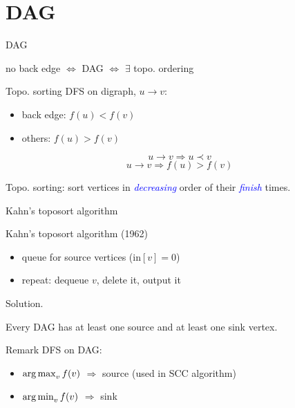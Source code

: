 \section{DAG}

\begin{frame}{DAG}
  \begin{center}
    no back edge $\iff$ DAG $\iff$ $\exists$ topo. ordering
  \end{center}

  \begin{block}{Topo. sorting}
    DFS on digraph, $u \to v$:
    \begin{itemize}
      \item back edge: $f(u) < f(v)$
      \item others: $f(u) > f(v)$
    \end{itemize}

    \[ u \to v \Rightarrow u \prec v \] 
    \[ u \to v \Rightarrow f(u) > f(v) \]

    \begin{center}
      Topo. sorting: sort vertices in \textcolor{blue}{\emph{decreasing}} order of their \textcolor{blue}{\emph{finish}} times.
    \end{center}
  \end{block}
\end{frame}
\begin{frame}{Kahn's toposort algorithm}
  \begin{exampleblock}{Kahn's toposort algorithm (1962) }
    \begin{itemize}
      \item queue for source vertices ($\text{in}[v] = 0$)
      \item repeat: dequeue $v$, delete it, output it
    \end{itemize}
  \end{exampleblock}

  \begin{block}{Solution.}
    \begin{lemma}
      Every DAG has at least one source and at least one sink vertex.
    \end{lemma}
  \end{block}

  \begin{alertblock}{Remark}
    DFS on DAG:
    \begin{itemize}
      \item $\operatorname*{arg\,max}_{v} f(v)$ $\Rightarrow$ source (used in SCC algorithm)
      \item $\operatorname*{arg\,min}_{v} f(v)$ $\Rightarrow$ sink
    \end{itemize}
  \end{alertblock}
\end{frame}
